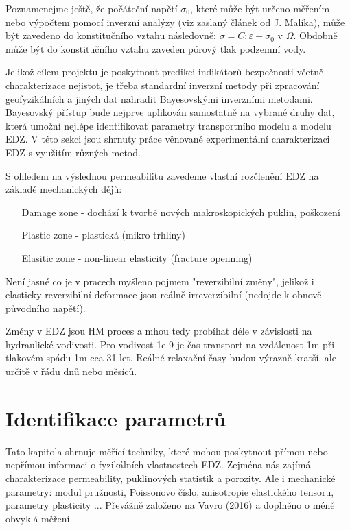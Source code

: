 \documentclass{article}
\newcommand{\alert}[1]{{\color{red}#1}}
\begin{document}
Poznamenejme  ještě, že počáteční napětí $\sigma_0$, které může být určeno měřením \alert{nebo výpočtem pomocí inverzní analýzy (viz zaslaný článek od J. Malíka),  může být zavedeno do konstitučního vztahu následovně:} $\sigma = C  : \varepsilon + \sigma_0$ v $\Omega$. Obdobně může být do konstitučního vztahu zaveden pórový tlak podzemní vody.


Jelikož cílem projektu je poskytnout predikci indikátorů bezpečnosti 
včetně charakterizace nejistot, je třeba standardní inverzní metody při zpracování geofyzikálních a jiných dat nahradit Bayesovskými inverzními metodami. Bayesovský přístup bude nejprve aplikován samostatně na vybrané druhy dat, která umožní nejlépe identifikovat parametry transportního modelu a modelu EDZ. V této sekci jsou shrnuty práce věnované experimentální charakterizaci EDZ s využitím různých metod.

S ohledem na výslednou permeabilitu zavedeme vlastní rozčlenění EDZ na základě mechanických dějů:
\begin{itemize}
    \item [Damage zone] - dochází k tvorbě nových makroskopických puklin, poškození
    \item [Plastic zone] - plastická (mikro trhliny)
    \item [Elasitic zone] - non-linear elasticity (fracture openning)
\end{itemize}
Není jasné co je v pracech myšleno pojmem "reverzibilní změny", jelikož i elasticky reverzibilní deformace jsou reálně irreverzibilní (nedojde k obnově původního napětí).



Změny v EDZ jsou HM proces a mhou tedy probíhat déle v závislosti na hydraulické vodivosti. Pro vodivost 1e-9 je čas transport na vzdálenost 1m při tlakovém spádu 1m cca 31 let. Reálné relaxační časy budou výrazně kratší, ale určitě v řádu dnů nebo měsíců. 

\section{Identifikace parametrů}
\label{sec:parameters}

Tato kapitola shrnuje měřící techniky, které mohou poskytnout přímou nebo nepřímou informaci 
o fyzikálních vlastnostech EDZ. Zejména nás zajímá charakterizace permeability, puklinových statistik a porozity. Ale i mechanické parametry: modul pružnosti, Poissonovo číslo, anisotropie elastického tensoru,  parametry plasticity ...
Převážně založeno na Vavro (2016) \cite{Vavro2016} a doplněno o méně obvyklá měření.
\end{document}
